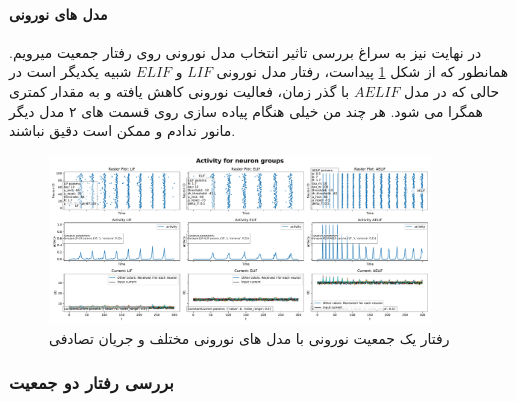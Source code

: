             \paragraph*{مدل های نورونی}
                در نهایت نیز به سراغ بررسی تاثیر انتخاب مدل نورونی روی رفتار جمعیت میرویم. همانطور که از شکل
                \ref{fig:part2-one-ng-full-synapse-diff-neuron-model}
                پیداست، رفتار مدل نورونی 
                $LIF$ و
                $ELIF$ 
                شبیه یکدیگر است در حالی که در مدل 
                $AELIF$ 
                با گذر زمان، فعالیت نورونی کاهش یافته و به مقدار کمتری همگرا می شود. هر چند من خیلی هنگام پیاده سازی روی قسمت های ۲ مدل دیگر مانور ندادم و ممکن است دقیق نباشند.
                \begin{figure}[!ht]
                    \centering
                    \includegraphics[width=0.9\textwidth]{plots/part2-one-ng-full-synapse-diff-neuron-model.pdf} 
                    \caption{رفتار یک جمعیت نورونی با مدل های نورونی مختلف و جریان تصادفی}
                    \label{fig:part2-one-ng-full-synapse-diff-neuron-model}
                \end{figure}
        \subsubsection{بررسی رفتار دو جمعیت}
